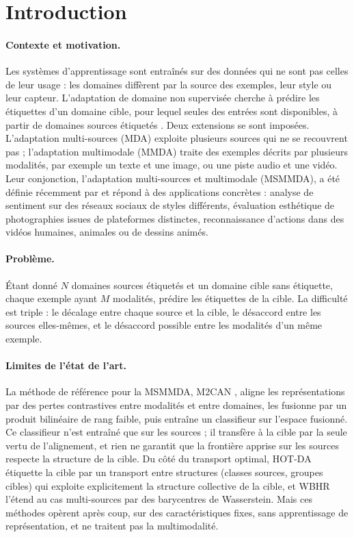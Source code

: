 \documentclass[11pt,a4paper]{article}
\theoremstyle{definition}
\theoremstyle{remark}
\begin{document}
\section{Introduction}\label{sec-intro}

\paragraph{Contexte et motivation.}
Les systèmes d'apprentissage sont entraînés sur des données qui ne sont pas celles de leur usage : les domaines diffèrent
par la source des exemples, leur style ou leur capteur. L'adaptation de domaine non supervisée cherche à prédire les
étiquettes d'un domaine cible, pour lequel seules des entrées sont disponibles, à partir de domaines sources étiquetés
\citep{courty2017otda}. Deux extensions se sont imposées. L'adaptation multi-sources (MDA) exploite plusieurs sources
qui ne se recouvrent pas ; l'adaptation multimodale (MMDA) traite des exemples décrits par plusieurs modalités, par
exemple un texte et une image, ou une piste audio et une vidéo. Leur conjonction, l'adaptation multi-sources et
multimodale (MSMMDA), a été définie récemment par \citet{zhao2025msmmda} et répond à des applications concrètes :
analyse de sentiment sur des réseaux sociaux de styles différents, évaluation esthétique de photographies issues de
plateformes distinctes, reconnaissance d'actions dans des vidéos humaines, animales ou de dessins animés.

\paragraph{Problème.}
Étant donné $N$ domaines sources étiquetés et un domaine cible sans étiquette, chaque exemple ayant $M$ modalités,
prédire les étiquettes de la cible. La difficulté est triple : le décalage entre chaque source et la cible, le
désaccord entre les sources elles-mêmes, et le désaccord possible entre les modalités d'un même exemple.

\paragraph{Limites de l'état de l'art.}
La méthode de référence pour la MSMMDA, M2CAN \citep{zhao2025msmmda}, aligne les représentations par des pertes
contrastives entre modalités et entre domaines, les fusionne par un produit bilinéaire de rang faible, puis entraîne un
classifieur sur l'espace fusionné. Ce classifieur n'est entraîné que sur les sources ; il transfère à la cible par la
seule vertu de l'alignement, et rien ne garantit que la frontière apprise sur les sources respecte la structure de la
cible. Du côté du transport optimal, HOT-DA \citep{elhamri2022hotda} étiquette la cible par un transport entre
structures (classes sources, groupes cibles) qui exploite explicitement la structure collective de la cible, et WBHR
\citep{elhamri2025wbhr} l'étend au cas multi-sources par des barycentres de Wasserstein. Mais ces méthodes opèrent après
coup, sur des caractéristiques fixes, sans apprentissage de représentation, et ne traitent pas la multimodalité.
\end{document}
